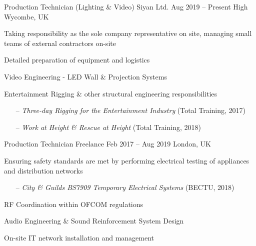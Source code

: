 \begin{cventries}
    \cventry
      {Production Technician (Lighting \& Video)}
      {Siyan Ltd.}
      {Aug 2019 -- Present}
      {High Wycombe, UK}
      {
        \begin{cvitems}
          \item Taking responsibility as the sole company representative on site, managing small teams of external contractors on-site
          \item Detailed preparation of equipment and logistics
          \item Video Engineering - LED Wall \& Projection Systems
          \item Entertainment Rigging \& other structural engineering responsibilities
          \begin{itemize}
              \item[--] \textit{\color{awesome} Three-day Rigging for the Entertainment Industry} (Total Training, 2017)
              \item[--] \textit{\color{awesome} Work at Height \& Rescue at Height} (Total Training, 2018)
          \end{itemize}
        \end{cvitems}
      }

    \cventry
      {Production Technician}
      {Freelance}
      {Feb 2017 -- Aug 2019}
      {London, UK}
      {
        \begin{cvitems}
          \item Ensuring safety standards are met by performing electrical testing of appliances and distribution networks
          \begin{itemize}
              \item[--] \textit{\color{awesome} City \& Guilds BS7909 Temporary Electrical Systems} (BECTU, 2018)
          \end{itemize}
          \item RF Coordination within OFCOM regulations
          \item Audio Engineering \& Sound Reinforcement System Design
          \item On-site IT network installation and management
        \end{cvitems}
      }


  \end{cventries}

